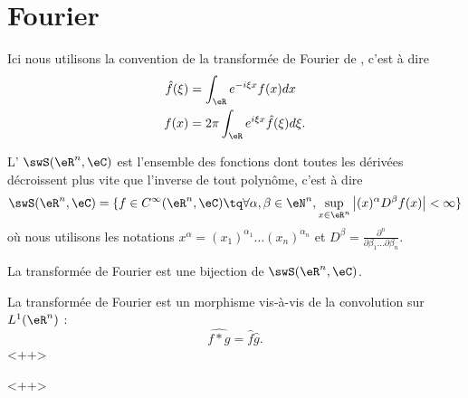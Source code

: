 
\section{Fourier}

Ici nous utilisons la convention de la transformée de Fourier de , c'est à dire
\begin{subequations}
    \begin{align}
        \hat f(\xi)&=\int_{\eR} e^{-i\xi x}f(x)dx\\
        f(x)&=2\pi\int_{\eR} e^{i\xi x}\hat f(\xi)d\xi.
    \end{align}
\end{subequations}

L' \( \swS(\eR^n,\eC)\) est l'ensemble des fonctions dont toutes les dérivées décroissent plus vite que l'inverse de tout polynôme, c'est à dire
\begin{equation}
    \swS(\eR^n,\eC)=\{ f\in C^{\infty}(\eR^n,\eC)\tq \forall \alpha,\beta\in \eN^n,\sup_{x\in \eR^n}\big| (x)^{\alpha}D^{\beta}f(x) \big|<\infty \}
\end{equation}
où nous utilisons les notations \( x^{\alpha}=(x_1)^{\alpha_1}\ldots (x_n)^{\alpha_n}\) et \( D^{\beta}=\frac{ \partial^n  }{ \partial \beta_1\ldots\partial \beta_n }\).

\begin{proposition}
    La transformée de Fourier est une bijection de \( \swS(\eR^n,\eC)\).    
\end{proposition}

\begin{proposition}
    La transformée de Fourier est un morphisme vis-à-vis de la convolution sur \( L^1(\eR^n)\) :
    \begin{equation}
        \widehat{f*g}=\hat f\hat g.
    \end{equation}
    <++>
\end{proposition}
<++>
